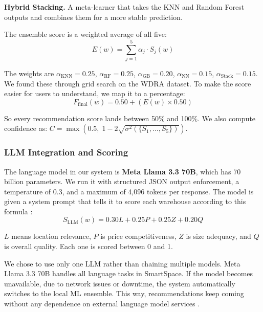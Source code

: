 \documentclass[pdflatex,sn-mathphys-num]{sn-jnl}
\theoremstyle{thmstyleone}
\theoremstyle{thmstyletwo}
\theoremstyle{thmstylethree}
\begin{document}
\textbf{Hybrid Stacking.}
A meta-learner that takes the KNN and Random Forest outputs
and combines them for a more stable prediction.

The ensemble score is a weighted average of all five:
\begin{equation}
E(w) = \sum_{j=1}^{5} \alpha_j \cdot S_j(w)
\label{eq:ensemble}
\end{equation}

\noindent
The weights are
$\alpha_{\text{KNN}} = 0.25$,
$\alpha_{\text{RF}} = 0.25$,
$\alpha_{\text{GB}} = 0.20$,
$\alpha_{\text{NN}} = 0.15$,
$\alpha_{\text{Stack}} = 0.15$.
We found these through grid search on the WDRA dataset.
To make the score easier for users to understand, we map it
to a percentage:
\begin{equation}
F_{\text{final}}(w) = 0.50 + \left(E(w) \times 0.50\right)
\label{eq:final}
\end{equation}

\noindent
So every recommendation score lands between 50\% and 100\%.
We also compute confidence as:
$C = \max(0.5,\; 1 - 2\sqrt{\sigma^2(\{S_1, \ldots, S_5\})})$.


\subsubsection{LLM Integration and Scoring}%
\label{subsubsec:llm-integration}

The language model in our system is
\textbf{Meta Llama 3.3 70B}, which has 70 billion parameters.
We run it with structured JSON output enforcement,
a temperature of 0.3, and a maximum of 4,096 tokens per
response.
The model is given a system prompt that tells it to score
each warehouse according to this formula \cite{b3, b7}:
\begin{equation}
S_{\text{LLM}}(w) = 0.30L + 0.25P + 0.25Z + 0.20Q
\label{eq:llm}
\end{equation}

\noindent
$L$ means location relevance, $P$ is price competitiveness,
$Z$ is size adequacy, and $Q$ is overall quality.
Each one is scored between 0 and 1.

We chose to use only one LLM rather than chaining multiple
models.
Meta Llama 3.3 70B handles all language tasks in SmartSpace.
If the model becomes unavailable, due to network issues or
downtime, the system automatically switches to the local
ML ensemble.
This way, recommendations keep coming without any dependence
on external language model services \cite{b7, b4}.
\end{document}
